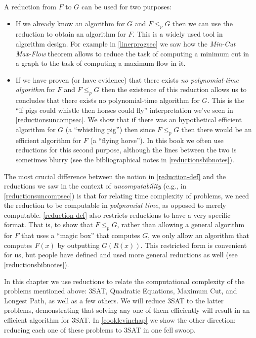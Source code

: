 A reduction from \(F\) to \(G\) can be used for two purposes:

\begin{itemize}
\item
  If we already know an algorithm for \(G\) and \(F \leq_p G\) then we
  can use the reduction to obtain an algorithm for \(F\). This is a
  widely used tool in algorithm design. For example in
  \cref{linerprogsec} we saw how the \emph{Min-Cut Max-Flow} theorem
  allows to reduce the task of computing a minimum cut in a graph to the
  task of computing a maximum flow in it.
\item
  If we have proven (or have evidence) that there exists \emph{no
  polynomial-time algorithm} for \(F\) and \(F \leq_p G\) then the
  existence of this reduction allows us to concludes that there exists
  no polynomial-time algorithm for \(G\). This is the ``if pigs could
  whistle then horses could fly'' interpretation we've seen in
  \cref{reductionsuncompsec}. We show that if there was an hypothetical
  efficient algorithm for \(G\) (a ``whistling pig'') then since
  \(F \leq_p G\) then there would be an efficient algorithm for \(F\) (a
  ``flying horse''). In this book we often use reductions for this
  second purpose, although the lines between the two is sometimes blurry
  (see the bibliographical notes in \cref{reductionsbibnotes}).
\end{itemize}

The most crucial difference between the notion in \cref{reduction-def}
and the reductions we saw in the context of \emph{uncomputability}
(e.g., in \cref{reductionsuncompsec}) is that for relating time
complexity of problems, we need the reduction to be computable in
\emph{polynomial time}, as opposed to merely computable.
\cref{reduction-def} also restricts reductions to have a very specific
format. That is, to show that \(F \leq_p G\), rather than allowing a
general algorithm for \(F\) that uses a ``magic box'' that computes
\(G\), we only allow an algorithm that computes \(F(x)\) by outputting
\(G(R(x))\). This restricted form is convenient for us, but people have
defined and used more general reductions as well (see
\cref{reductionsbibnotes}).

In this chapter we use reductions to relate the computational complexity
of the problems mentioned above: 3SAT, Quadratic Equations, Maximum Cut,
and Longest Path, as well as a few others. We will reduce 3SAT to the
latter problems, demonstrating that solving any one of them efficiently
will result in an efficient algorithm for 3SAT. In \cref{cooklevinchap}
we show the other direction: reducing each one of these problems to 3SAT
in one fell swoop.

